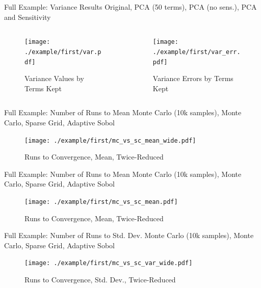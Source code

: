 \documentclass[t,9pt,svgnames]{beamer}
\begin{document}
\begin{frame}[fragile]{Full Example: Variance Results}
  \color{black} Original,
  \color{blue} PCA (50 terms),
  \color{red} PCA (no sens.),
  \color{ForestGreen} PCA and Sensitivity
  \begin{columns}
    \begin{column}{0.5\textwidth}
      \begin{figure}
        \centering
        \texttt{[image: ./example/first/var.pdf]}
        \caption{Variance Values by Terms Kept}
      \end{figure}
    \end{column}
    \begin{column}{0.5\textwidth}
      \begin{figure}
        \centering
        \texttt{[image: ./example/first/var\_err.pdf]}
        \caption{Variance Errors by Terms Kept}
      \end{figure}
    \end{column}
  \end{columns}
\end{frame}

\begin{frame}[fragile]{Full Example: Number of Runs to Mean}
  \color{magenta} Monte Carlo (10k samples),
  \color{blue} Monte Carlo,
  \color{ForestGreen} Sparse Grid,
  \color{red} Adaptive Sobol
      \begin{figure}
        \centering
        \texttt{[image: ./example/first/mc\_vs\_sc\_mean\_wide.pdf]}
        \caption{Runs to Convergence, Mean, Twice-Reduced}
      \end{figure}
\end{frame}

\begin{frame}[fragile]{Full Example: Number of Runs to Mean}
  \color{magenta} Monte Carlo (10k samples),
  \color{blue} Monte Carlo,
  \color{ForestGreen} Sparse Grid,
  \color{red} Adaptive Sobol
      \begin{figure}
        \centering
        \texttt{[image: ./example/first/mc\_vs\_sc\_mean.pdf]}
        \caption{Runs to Convergence, Mean, Twice-Reduced}
      \end{figure}
\end{frame}

\begin{frame}[fragile]{Full Example: Number of Runs to Std. Dev.}
  \color{magenta} Monte Carlo (10k samples),
  \color{blue} Monte Carlo,
  \color{ForestGreen} Sparse Grid,
  \color{red} Adaptive Sobol
      \begin{figure}
        \centering
        \texttt{[image: ./example/first/mc\_vs\_sc\_var\_wide.pdf]}
        \caption{Runs to Convergence, Std. Dev., Twice-Reduced}
      \end{figure}
\end{frame}
\end{document}
